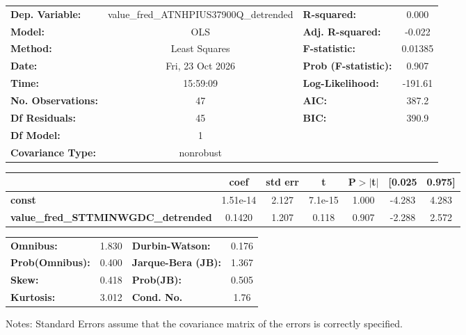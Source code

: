 \begin{center}
\begin{tabular}{lclc}
\toprule
\textbf{Dep. Variable:}                     & value\_fred\_ATNHPIUS37900Q\_detrended & \textbf{  R-squared:         } &     0.000   \\
\textbf{Model:}                             &                  OLS                   & \textbf{  Adj. R-squared:    } &    -0.022   \\
\textbf{Method:}                            &             Least Squares              & \textbf{  F-statistic:       } &   0.01385   \\
\textbf{Date:}                              &            Fri, 23 Oct 2026            & \textbf{  Prob (F-statistic):} &    0.907    \\
\textbf{Time:}                              &                15:59:09                & \textbf{  Log-Likelihood:    } &   -191.61   \\
\textbf{No. Observations:}                  &                     47                 & \textbf{  AIC:               } &     387.2   \\
\textbf{Df Residuals:}                      &                     45                 & \textbf{  BIC:               } &     390.9   \\
\textbf{Df Model:}                          &                      1                 & \textbf{                     } &             \\
\textbf{Covariance Type:}                   &               nonrobust                & \textbf{                     } &             \\
\bottomrule
\end{tabular}
\begin{tabular}{lcccccc}
                                            & \textbf{coef} & \textbf{std err} & \textbf{t} & \textbf{P$> |$t$|$} & \textbf{[0.025} & \textbf{0.975]}  \\
\midrule
\textbf{const}                              &     1.51e-14  &        2.127     &   7.1e-15  &         1.000        &       -4.283    &        4.283     \\
\textbf{value\_fred\_STTMINWGDC\_detrended} &       0.1420  &        1.207     &     0.118  &         0.907        &       -2.288    &        2.572     \\
\bottomrule
\end{tabular}
\begin{tabular}{lclc}
\textbf{Omnibus:}       &  1.830 & \textbf{  Durbin-Watson:     } &    0.176  \\
\textbf{Prob(Omnibus):} &  0.400 & \textbf{  Jarque-Bera (JB):  } &    1.367  \\
\textbf{Skew:}          &  0.418 & \textbf{  Prob(JB):          } &    0.505  \\
\textbf{Kurtosis:}      &  3.012 & \textbf{  Cond. No.          } &     1.76  \\
\bottomrule
\end{tabular}
\end{center}

Notes: \newline
 [1] Standard Errors assume that the covariance matrix of the errors is correctly specified.